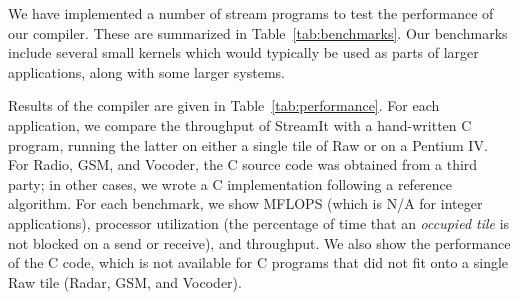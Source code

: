 We have implemented a number of stream programs to test the
performance of our compiler.  These are summarized in
Table~\ref{tab:benchmarks}.  Our benchmarks include several small
kernels which would typically be used as parts of larger applications,
along with some larger systems.

Results of the compiler are given in Table~\ref{tab:performance}.
For each application, we compare the throughput of StreamIt with a
hand-written C program, running the latter on either a single tile of
Raw or on a Pentium IV.  For Radio, GSM, and Vocoder, the C source
code was obtained from a third party; in other cases, we wrote a C
implementation following a reference algorithm.  For each benchmark,
we show MFLOPS (which is N/A for integer applications), processor
utilization (the percentage of time that an {\it occupied tile} is not
blocked on a send or receive), and throughput.  We also show the
performance of the C code, which is not available for C programs that
did not fit onto a single Raw tile (Radar, GSM, and Vocoder).

